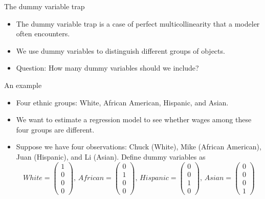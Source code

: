 \documentclass[presentation,10pt]{beamer}
\begin{document}
\begin{frame}[label={sec:orga379ca1}]{The dummy variable trap}
\begin{itemize}
\item The dummy variable trap is a case of perfect multicollinearity
that a modeler often encounters.
\item We use dummy variables to distinguish different groups of objects.
\item Question: How many dummy variables should we include?
\end{itemize}

\begin{block}{An example}
\begin{itemize}
\item Four ethnic groups: White, African American, Hispanic, and
Asian.
\item We want to estimate a regression model to see whether wages among
these four groups are different.
\item Suppose we have four observations: Chuck (White), 
Mike (African American), Juan (Hispanic), and Li (Asian). Define
dummy variables as
\begin{equation*}
White =
\begin{pmatrix}
1 \\
0 \\
0 \\
0
\end{pmatrix},\,
African =
\begin{pmatrix}
0 \\
1 \\
0 \\
0
\end{pmatrix},\,
Hispanic =
\begin{pmatrix}
0 \\
0 \\
1 \\
0
\end{pmatrix},\,
Asian =
\begin{pmatrix}
0 \\
0 \\
0 \\
1
\end{pmatrix}
\end{equation*}
\end{itemize}
\end{block}
\end{frame}
\end{document}
